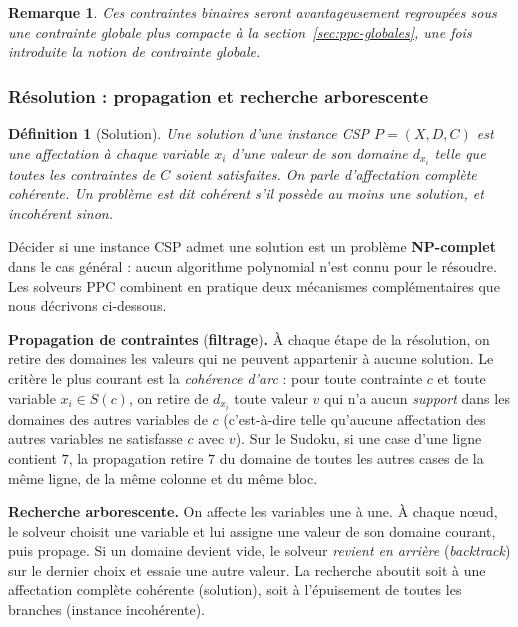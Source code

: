 \documentclass[11pt,a4paper]{article}
\newtheorem{definition}{Définition}
\newtheorem{remarque}{Remarque}
\begin{document}
\begin{remarque}
Ces contraintes binaires seront avantageusement regroupées sous une
contrainte globale plus compacte à la
section~\ref{sec:ppc-globales}, une fois introduite la notion de
contrainte globale.
\end{remarque}

\subsubsection{Résolution : propagation et recherche arborescente}

\begin{definition}[Solution]
Une \emph{solution} d'une instance CSP $P = (X, D, C)$ est une
affectation à chaque variable $x_i$ d'une valeur de son domaine
$d_{x_i}$ telle que toutes les contraintes de $C$ soient satisfaites.
On parle d'\emph{affectation complète cohérente}. Un problème est dit
\emph{cohérent} s'il possède au moins une solution, et
\emph{incohérent} sinon.
\end{definition}

Décider si une instance CSP admet une solution est un problème
\textbf{NP-complet} dans le cas général : aucun algorithme polynomial
n'est connu pour le résoudre. Les solveurs PPC combinent en pratique
deux mécanismes complémentaires que nous décrivons ci-dessous.

\textbf{Propagation de contraintes} (\textbf{filtrage})\textbf{.}
À chaque étape de la résolution, on retire des domaines les valeurs
qui ne peuvent appartenir à aucune
solution. Le critère le plus courant est la \emph{cohérence d'arc} :
pour toute contrainte $c$ et toute variable $x_i \in S(c)$, on retire
de $d_{x_i}$ toute valeur $v$ qui n'a aucun \emph{support} dans les
domaines des autres variables de $c$ (c'est-à-dire telle qu'aucune
affectation des autres variables ne satisfasse $c$ avec $v$). Sur le
Sudoku, si une case d'une ligne contient $7$, la propagation retire
$7$ du domaine de toutes les autres cases de la même ligne, de la même
colonne et du même bloc.

\textbf{Recherche arborescente.} On affecte les variables une à une.
À chaque nœud, le solveur choisit une variable et lui assigne une
valeur de son domaine courant, puis propage. Si un domaine devient
vide, le solveur \emph{revient en arrière} (\emph{backtrack}) sur le
dernier choix et essaie une autre valeur. La recherche aboutit soit à
une affectation complète cohérente (solution), soit à l'épuisement de
toutes les branches (instance incohérente).
\end{document}
